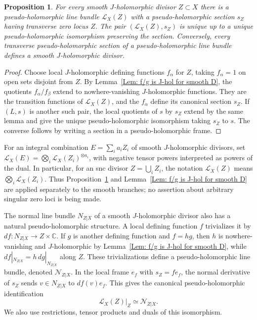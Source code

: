 \documentclass[11pt]{amsart}
\numberwithin{equation}{section}
\theoremstyle{plain}
\newtheorem{proposition}[theorem]{Proposition}
\theoremstyle{definition}
\newcommand{\CC}{\mathbb{C}}
\newcommand{\scrL}{\mathscr{L}}
\newcommand{\scrN}{\mathscr{N}}
\begin{document}
\begin{proposition}
\label{Prop: O(D)}
For every smooth $J$-holomorphic divisor $Z\subset X$ there is a
pseudo-holo\-mor\-phic line bundle $\scrL_X(Z)$ with a pseudo-holomorphic
section $s_Z$ having transverse zero locus $Z$. The pair $(\scrL_X(Z),s_Z)$ is
unique up to a unique pseudo-holomorphic isomorphism preserving the section.
Conversely, every transverse pseudo-holomorphic section of a pseudo-holomorphic
line bundle defines a smooth $J$-holomorphic divisor.
\end{proposition}

\begin{proof}
Choose local $J$-holomorphic defining functions $f_\alpha$ for $Z$, taking
$f_\alpha=1$ on open sets disjoint from $Z$. By
Lemma~\ref{Lem: f/g is J-hol for smooth D}, the quotients
$f_\alpha/f_\beta$ extend to nowhere-vanishing $J$-holomorphic functions.
They are the transition functions of $\scrL_X(Z)$, and the $f_\alpha$ define
its canonical section $s_Z$. If $(L,s)$ is another such pair, the local
quotients of $s$ by $s_Z$ extend by the same lemma and give the unique
pseudo-holomorphic isomorphism taking $s_Z$ to $s$. The converse follows by
writing a section in a pseudo-holomorphic frame.
\end{proof}

For an integral combination $E=\sum_i a_iZ_i$ of smooth $J$-holomorphic
divisors, set
$\scrL_X(E)=\bigotimes_i\scrL_X(Z_i)^{\otimes a_i}$, with negative tensor
powers interpreted as powers of the dual. In particular, for an snc divisor
$Z=\bigcup_iZ_i$, the notation $\scrL_X(Z)$ means
$\bigotimes_i\scrL_X(Z_i)$. Thus Proposition~\ref{Prop: O(D)} and
Lemma~\ref{Lem: f/g is J-hol for smooth D} are applied separately to the
smooth branches; no assertion about arbitrary singular zero loci is being
made.

The normal line bundle $N_{Z|X}$ of a smooth $J$-holomorphic divisor also has a
natural pseudo-holomorphic structure. A local defining function $f$ trivializes
it by $df:N_{Z|X}\to Z\times\CC$. If $g$ is another defining function and
$f=hg$, then $h$ is nowhere-vanishing and $J$-holomorphic by Lemma~\ref{Lem: f/g
is J-hol for smooth D}, while $df|_{N_{Z|X}}=h\,dg|_{N_{Z|X}}$ along $Z$. These
trivializations define a pseudo-holomorphic line bundle, denoted $\scrN_{Z|X}$.
In the local frame $e_f$ with $s_Z=f e_f$, the normal derivative of $s_Z$
sends $v\in N_{Z|X}$ to $df(v)e_f$. This gives the canonical
pseudo-holomorphic identification
\begin{equation}
\label{Eqn: divisor-normal-bundle}
\scrL_X(Z)|_Z\simeq\scrN_{Z|X}.
\end{equation}
We also use restrictions, tensor products and duals of this isomorphism.
\end{document}
